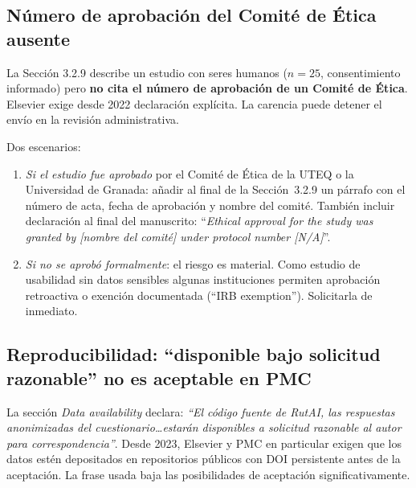 \documentclass[11pt,a4paper]{article}
\begin{document}
\subsection{N\'umero de aprobaci\'on del Comit\'e de \'Etica ausente}

\begin{deficiencia}[M.4 --- Deficiencia]
La Secci\'on 3.2.9 describe un estudio con seres humanos ($n=25$, consentimiento informado) pero \textbf{no cita el n\'umero de aprobaci\'on de un Comit\'e de \'Etica}. Elsevier exige desde 2022 declaraci\'on expl\'icita. La carencia puede detener el env\'io en la revisi\'on administrativa.
\end{deficiencia}

\begin{abordaje}
Dos escenarios:

\begin{enumerate}
  \item \emph{Si el estudio fue aprobado} por el Comit\'e de \'Etica de la UTEQ o la Universidad de Granada: a\~nadir al final de la Secci\'on~3.2.9 un p\'arrafo con el n\'umero de acta, fecha de aprobaci\'on y nombre del comit\'e. Tambi\'en incluir declaraci\'on al final del manuscrito: ``\emph{Ethical approval for the study was granted by [nombre del comit\'e] under protocol number [N/A]}''.
  \item \emph{Si no se aprob\'o formalmente}: el riesgo es material. Como estudio de usabilidad sin datos sensibles algunas instituciones permiten aprobaci\'on retroactiva o exenci\'on documentada (``IRB exemption''). Solicitarla de inmediato.
\end{enumerate}
\end{abordaje}

\subsection{Reproducibilidad: ``disponible bajo solicitud razonable'' no es aceptable en PMC}

\begin{deficiencia}[M.5 --- Deficiencia]
La secci\'on \emph{Data availability} declara: \emph{``El c\'odigo fuente de RutAI, las respuestas anonimizadas del cuestionario\ldots estar\'an disponibles a solicitud razonable al autor para correspondencia''}. Desde 2023, Elsevier y PMC en particular exigen que los datos est\'en depositados en repositorios p\'ublicos con DOI persistente antes de la aceptaci\'on. La frase usada baja las posibilidades de aceptaci\'on significativamente.
\end{deficiencia}
\end{document}
